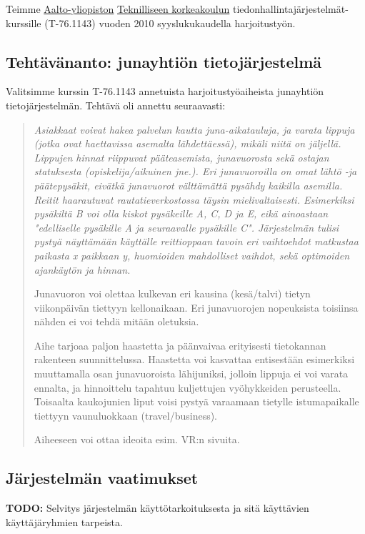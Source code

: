 \documentclass[a4paper,twoside,titlepage,12pt]{article}
\begin{document}
Teimme \href{http://www.aalto.fi/}{Aalto-yliopiston} \href{http://www.tkk.fi/}{Teknilliseen korkeakoulun} tiedonhallintajärjestelmät-kurssille (T-76.1143) vuoden 2010 syyslukukaudella harjoitustyön.



\subsection{Tehtävänanto: junayhtiön tietojärjestelmä}

Valitsimme kurssin T-76.1143 annetuista harjoitustyöaiheista junayhtiön tietojärjestelmän. Tehtävä oli annettu seuraavasti:

\begin{quotation}
\itshape
Asiakkaat voivat hakea palvelun kautta juna-aikatauluja, ja varata lippuja (jotka ovat haettavissa asemalta lähdettäessä), mikäli niitä on jäljellä. Lippujen hinnat riippuvat pääteasemista, junavuorosta sekä ostajan statuksesta (opiskelija/aikuinen jne.). Eri junavuoroilla on omat lähtö -ja päätepysäkit, eivätkä junavuorot välttämättä pysähdy kaikilla asemilla. Reitit haarautuvat rautatieverkostossa täysin mielivaltaisesti. Esimerkiksi pysäkiltä B voi olla kiskot pysäkeille A, C, D ja E, eikä ainoastaan "edelliselle pysäkille A ja seuraavalle pysäkille C". Järjestelmän tulisi pystyä näyttämään käyttälle reittioppaan tavoin eri vaihtoehdot matkustaa paikasta x paikkaan y, huomioiden mahdolliset vaihdot, sekä optimoiden ajankäytön ja hinnan.

Junavuoron voi olettaa kulkevan eri kausina (kesä/talvi) tietyn viikonpäivän tiettyyn kellonaikaan. Eri junavuorojen nopeuksista toisiinsa nähden ei voi tehdä mitään oletuksia.

Aihe tarjoaa paljon haastetta ja päänvaivaa erityisesti tietokannan rakenteen suunnittelussa. Haastetta voi kasvattaa entisestään esimerkiksi muuttamalla osan junavuoroista lähijuniksi, jolloin lippuja ei voi varata ennalta, ja hinnoittelu tapahtuu kuljettujen vyöhykkeiden perusteella. Toisaalta kaukojunien liput voisi pystyä varaamaan tietylle istumapaikalle tiettyyn vaunuluokkaan (travel/business).

Aiheeseen voi ottaa ideoita esim. VR:n sivuita. 
\end{quotation}

\subsection{Järjestelmän vaatimukset}
\textbf{TODO:} Selvitys järjestelmän käyttötarkoituksesta ja sitä käyttävien käyttäjäryhmien tarpeista.
\end{document}
